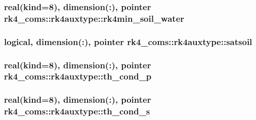 \subsubsection[{\texorpdfstring{rk4min\+\_\+soil\+\_\+water}{rk4min_soil_water}}]{\setlength{\rightskip}{0pt plus 5cm}real(kind=8), dimension(\+:), pointer rk4\+\_\+coms\+::rk4auxtype\+::rk4min\+\_\+soil\+\_\+water}\hypertarget{structrk4__coms_1_1rk4auxtype_a8520b0ab485e69fee8994a4088a2ca00}{}\label{structrk4__coms_1_1rk4auxtype_a8520b0ab485e69fee8994a4088a2ca00}
\subsubsection[{\texorpdfstring{satsoil}{satsoil}}]{\setlength{\rightskip}{0pt plus 5cm}logical, dimension(\+:), pointer rk4\+\_\+coms\+::rk4auxtype\+::satsoil}\hypertarget{structrk4__coms_1_1rk4auxtype_a54fe72b55c0b02258c500c320ef5f4c4}{}\label{structrk4__coms_1_1rk4auxtype_a54fe72b55c0b02258c500c320ef5f4c4}
\subsubsection[{\texorpdfstring{th\+\_\+cond\+\_\+p}{th_cond_p}}]{\setlength{\rightskip}{0pt plus 5cm}real(kind=8), dimension(\+:), pointer rk4\+\_\+coms\+::rk4auxtype\+::th\+\_\+cond\+\_\+p}\hypertarget{structrk4__coms_1_1rk4auxtype_a73dbe8480f8e37618760acc5ec3a2a1a}{}\label{structrk4__coms_1_1rk4auxtype_a73dbe8480f8e37618760acc5ec3a2a1a}
\subsubsection[{\texorpdfstring{th\+\_\+cond\+\_\+s}{th_cond_s}}]{\setlength{\rightskip}{0pt plus 5cm}real(kind=8), dimension(\+:), pointer rk4\+\_\+coms\+::rk4auxtype\+::th\+\_\+cond\+\_\+s}\hypertarget{structrk4__coms_1_1rk4auxtype_adbe58418107a9f022aa4ec6d3750e019}{}\label{structrk4__coms_1_1rk4auxtype_adbe58418107a9f022aa4ec6d3750e019}
